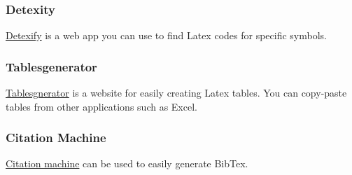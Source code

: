 \subsubsection{Detexity}
\href{http://detexify.kirelabs.org/classify.html}{Detexify} is a web app you can use to find Latex codes for specific symbols.

\subsubsection{Tablesgenerator}
\href{https://www.tablesgenerator.com/}{Tablesgnerator} is a website for easily creating Latex tables. You can copy-paste tables from other applications such as Excel.

\subsubsection{Citation Machine}
\href{http://www.citationmachine.net/bibtex/cite-a-website}{Citation machine} can be used to easily generate BibTex.